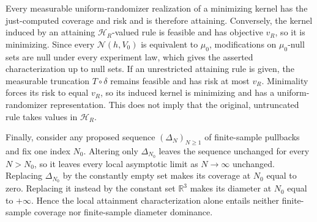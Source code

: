 Every measurable uniform-randomizer realization of a minimizing kernel has the just-computed coverage and risk and is therefore attaining.  Conversely, the kernel induced by an attaining \(\mathcal H_R\)-valued rule is feasible and has objective \(v_R\), so it is minimizing.  Since every \(\mathcal N(h,V_0)\) is equivalent to \(\mu_0\), modifications on \(\mu_0\)-null sets are null under every experiment law, which gives the asserted characterization up to null sets.  If an unrestricted attaining rule is given, the measurable truncation \(T\circ\delta\) remains feasible and has risk at most \(v_R\).  Minimality forces its risk to equal \(v_R\), so its induced kernel is minimizing and has a uniform-randomizer representation.  This does not imply that the original, untruncated rule takes values in \(\mathcal H_R\).

Finally, consider any proposed sequence \((\Delta_N)_{N\ge1}\) of finite-sample pullbacks and fix one index \(N_0\).  Altering only \(\Delta_{N_0}\) leaves the sequence unchanged for every \(N>N_0\), so it leaves every local asymptotic limit as \(N\to\infty\) unchanged.  Replacing \(\Delta_{N_0}\) by the constantly empty set makes its coverage at \(N_0\) equal to zero.  Replacing it instead by the constant set \(\mathbb R^3\) makes its diameter at \(N_0\) equal to \(+\infty\).  Hence the local attainment characterization alone entails neither finite-sample coverage nor finite-sample diameter dominance.
